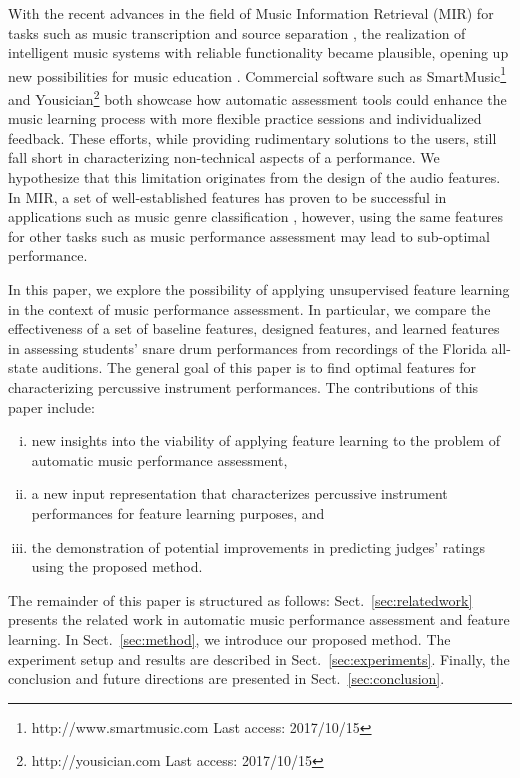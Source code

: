 \documentclass[conference]{IEEEtran}
\begin{document}
With the recent advances in the field of Music Information Retrieval (MIR) for tasks such as music transcription \cite{Benetos2013} and source separation \cite{Huang2014}, the realization of intelligent music systems with reliable functionality became plausible, opening up new possibilities for music education \cite{Dittmar2012}. Commercial software such as SmartMusic\footnote{http://www.smartmusic.com Last access: 2017/10/15} and Yousician\footnote{http://yousician.com Last access: 2017/10/15} both showcase how automatic assessment tools could enhance the music learning process with more flexible practice sessions and individualized feedback. These efforts, while providing rudimentary solutions to the users, still fall short in characterizing non-technical aspects of a performance. We hypothesize that this limitation originates from the design of the audio features. In MIR, a set of well-established features has proven to be successful in applications such as music genre classification \cite{Tzanetakis2002}, however, using the same features for other tasks such as music performance assessment may lead to sub-optimal performance. %

In this paper, we explore the possibility of applying unsupervised feature learning in the context of music performance assessment. In particular, we compare the effectiveness of a set of baseline features, designed features, and learned features in assessing students' snare drum performances from recordings of the Florida all-state auditions. The general goal of this paper is to find optimal features for characterizing percussive instrument performances. The contributions of this paper include:
\begin{enumerate}[(i)]
	\item   new insights into the viability of applying feature learning to the problem of automatic music performance assessment, 
    \item   a new input representation that characterizes percussive instrument performances for feature learning purposes, and 
    \item   the demonstration of potential improvements in predicting judges' ratings using the proposed method.
\end{enumerate} 

The remainder of this paper is structured as follows: Sect.~\ref{sec:relatedwork} presents the related work in automatic music performance assessment and feature learning. In Sect.~\ref{sec:method}, we introduce our proposed method. The experiment setup and results are described in Sect.~\ref{sec:experiments}. Finally, the conclusion and future directions are presented in Sect.~\ref{sec:conclusion}.
\end{document}
